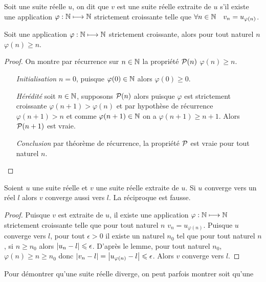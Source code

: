 \begin{defdef}
  Soit une suite réelle \(u\), on dit que \(v\) est une suite réelle extraite de 
  \(u\) s'il existe une application \(\varphi:\N \longmapsto \N\) strictement 
  croissante telle que \(\forall n\in \N \quad v_n = u_{\varphi(n)}\).
\end{defdef}
\begin{lemme}
  Soit une application \(\varphi:\N \longmapsto \N\) strictement croissante, 
  alors pour tout naturel \(n\) \(\varphi(n) \geqslant n\).
\end{lemme}
\begin{proof}
  On montre par récurrence sur \(n \in \N\) la propriété \(\P(n)\) \(\varphi(n) 
  \geqslant n\).
  \begin{itemize}
    \item[\emph{Initialisation}] \(n = 0\), puisque \(\varphi(0) \in \N\) alors 
      \(\varphi(0) \geqslant 0\).
    \item[\emph{Hérédité}] soit \(n \in \N\), supposons \(\P(n)\) alors puisque 
      \(\varphi\) est strictement croissante \(\varphi(n+1) > \varphi(n)\) et 
      par hypothèse de récurrence \(\varphi(n+1) > n\) et comme \(\varphi(n+1) 
      \in \N\) on a \(\varphi(n+1) \geqslant n+1\). Alors \(\P(n+1)\) est vraie.
    \item[\emph{Conclusion}] par théorème de récurrence, la propriété \(\P\) est 
      vraie pour tout naturel \(n\).
  \end{itemize}
\end{proof}
\begin{prop}
  Soient \(u\) une suite réelle et \(v\) une suite réelle extraite de \(u\). Si 
  \(u\) converge vers un réel \(l\) alors \(v\) converge aussi vers \(l\). La 
  réciproque est fausse.
\end{prop}
\begin{proof}
  Puisque \(v\) est extraite de \(u\), il existe une application \(\varphi:\N 
  \longmapsto \N\) strictement croissante telle que pour tout naturel \(n\) 
  \(v_n = u_{\varphi(n)}\). Puisque \(u\) converge vers \(l\), pour tout 
  \(\epsilon>0\) il existe un naturel \(n_0\) tel que pour tout naturel \(n\), 
  si \(n \geqslant n_0\) alors \(\abs{u_n-l} \leqslant \epsilon\). D'après le 
  lemme, pour tout naturel \(n_0\), \(\varphi(n) \geqslant n \geqslant n_0\) 
  donc \(\abs{v_n-l} = \abs{u_{\varphi(n)}-l} \leqslant \epsilon\). Alors \(v\) 
  converge vers \(l\).
\end{proof}
Pour démontrer qu'une suite réelle diverge, on peut parfois montrer soit qu'une 
